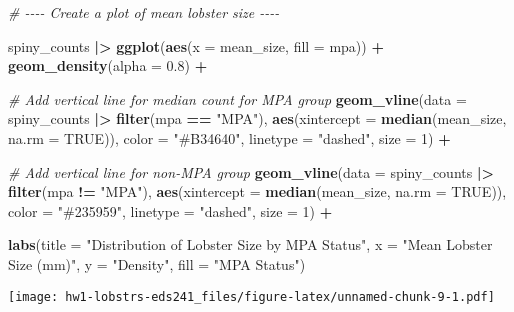 \documentclass[
]{article}
\newenvironment{Shaded}{\begin{snugshade}}{\end{snugshade}}
\newcommand{\AttributeTok}[1]{\textcolor[rgb]{0.13,0.29,0.53}{#1}}
\newcommand{\CommentTok}[1]{\textcolor[rgb]{0.56,0.35,0.01}{\textit{#1}}}
\newcommand{\ConstantTok}[1]{\textcolor[rgb]{0.56,0.35,0.01}{#1}}
\newcommand{\DecValTok}[1]{\textcolor[rgb]{0.00,0.00,0.81}{#1}}
\newcommand{\FloatTok}[1]{\textcolor[rgb]{0.00,0.00,0.81}{#1}}
\newcommand{\FunctionTok}[1]{\textcolor[rgb]{0.13,0.29,0.53}{\textbf{#1}}}
\newcommand{\NormalTok}[1]{#1}
\newcommand{\SpecialCharTok}[1]{\textcolor[rgb]{0.81,0.36,0.00}{\textbf{#1}}}
\newcommand{\StringTok}[1]{\textcolor[rgb]{0.31,0.60,0.02}{#1}}
\begin{document}
\begin{Shaded}
\begin{Highlighting}[]
\CommentTok{\# {-}{-}{-}{-} Create a plot of mean lobster size {-}{-}{-}{-}}

\NormalTok{spiny\_counts }\SpecialCharTok{|\textgreater{}}
    \FunctionTok{ggplot}\NormalTok{(}\FunctionTok{aes}\NormalTok{(}\AttributeTok{x =}\NormalTok{ mean\_size, }\AttributeTok{fill =}\NormalTok{ mpa)) }\SpecialCharTok{+}
    \FunctionTok{geom\_density}\NormalTok{(}\AttributeTok{alpha =} \FloatTok{0.8}\NormalTok{) }\SpecialCharTok{+} 
    
    \CommentTok{\# Add vertical line for median count for MPA group}
     \FunctionTok{geom\_vline}\NormalTok{(}\AttributeTok{data =}\NormalTok{ spiny\_counts }\SpecialCharTok{|\textgreater{}} \FunctionTok{filter}\NormalTok{(mpa }\SpecialCharTok{==} \StringTok{"MPA"}\NormalTok{),}
                \FunctionTok{aes}\NormalTok{(}\AttributeTok{xintercept =} \FunctionTok{median}\NormalTok{(mean\_size, }\AttributeTok{na.rm =} \ConstantTok{TRUE}\NormalTok{)), }
             \AttributeTok{color =} \StringTok{"\#B34640"}\NormalTok{, }
             \AttributeTok{linetype =} \StringTok{"dashed"}\NormalTok{, }
             \AttributeTok{size =} \DecValTok{1}\NormalTok{) }\SpecialCharTok{+}
    
    \CommentTok{\# Add vertical line for non{-}MPA group}
    \FunctionTok{geom\_vline}\NormalTok{(}\AttributeTok{data =}\NormalTok{ spiny\_counts }\SpecialCharTok{|\textgreater{}} \FunctionTok{filter}\NormalTok{(mpa }\SpecialCharTok{!=} \StringTok{"MPA"}\NormalTok{), }\FunctionTok{aes}\NormalTok{(}\AttributeTok{xintercept =} \FunctionTok{median}\NormalTok{(mean\_size, }\AttributeTok{na.rm =} \ConstantTok{TRUE}\NormalTok{)), }
             \AttributeTok{color =} \StringTok{"\#235959"}\NormalTok{, }
             \AttributeTok{linetype =} \StringTok{"dashed"}\NormalTok{, }
             \AttributeTok{size =} \DecValTok{1}\NormalTok{) }\SpecialCharTok{+}
    
    \FunctionTok{labs}\NormalTok{(}\AttributeTok{title =} \StringTok{"Distribution of Lobster Size by MPA Status"}\NormalTok{,}
         \AttributeTok{x =} \StringTok{"Mean Lobster Size (mm)"}\NormalTok{,}
         \AttributeTok{y =} \StringTok{"Density"}\NormalTok{,}
         \AttributeTok{fill =} \StringTok{"MPA Status"}\NormalTok{) }
\end{Highlighting}
\end{Shaded}

\texttt{[image: hw1-lobstrs-eds241\_files/figure-latex/unnamed-chunk-9-1.pdf]}
\end{document}
